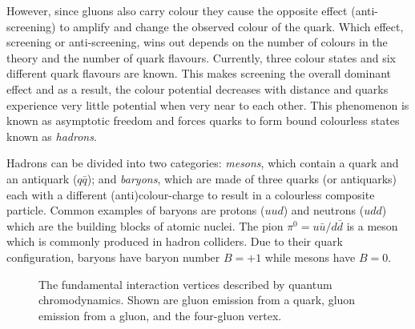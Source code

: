 However, since gluons also carry colour they cause the opposite effect (anti-screening) to amplify and change the observed colour of the quark. Which effect, screening or anti-screening, wins out depends on the number of colours in the theory and the number of quark flavours. Currently, three colour states and six different quark flavours are known. This makes screening the overall dominant effect and as a result, the colour potential decreases with distance and quarks experience very little potential when very near to each other. This phenomenon is known as asymptotic freedom and forces quarks to form bound colourless states known as \emph{hadrons}.

Hadrons can be divided into two categories: \emph{mesons}, which contain a quark and an antiquark ($q\bar{q}$); and \emph{baryons}, which are made of three quarks (or antiquarks) each with a different (anti)colour-charge to result in a colourless composite particle. Common examples of baryons are protons ($uud$) and neutrons ($udd$) which are the building blocks of atomic nuclei. The pion $\pi^{0}=u\bar{u}/d\bar{d}$ is a meson which is commonly produced in hadron colliders. Due to their quark configuration, baryons have baryon number $B=+1$ while mesons have $B=0$.
  
\begin{figure}[htbp]
  \centering
    \begin{minipage}[][][t]{.32\textwidth}
      \centering
      
    \label{fig:TheoryQCDColour}
    \end{minipage}
    \begin{minipage}[][][t]{.32\textwidth}
      \centering
        
      \label{fig:TheoryQCDThreeGluon}
    \end{minipage}
    \begin{minipage}[][][t]{.32\textwidth}
      \centering
        
      \label{fig:TheoryQCDFourGluon}
    \end{minipage}  
    \caption[The fundamental interaction vertices described by quantum chromodynamics.]{The fundamental interaction vertices described by quantum chromodynamics. Shown are  gluon emission from a quark,  gluon emission from a gluon, and  the four-gluon vertex.}
  \label{fig:TheoryQCDVertexes}
\end{figure}

